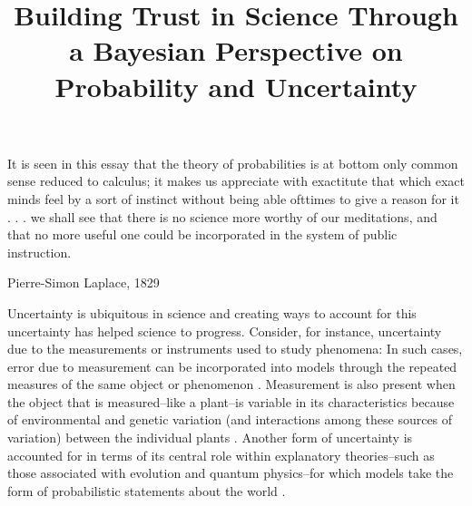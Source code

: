 \documentclass[man]{apa7}
\title{Building Trust in Science Through a Bayesian Perspective on Probability and Uncertainty}
\begin{document}
\maketitle

\setlength{\epigraphwidth}{1.0\textwidth} %
\epigraph{It is seen in this essay that the theory of probabilities is at bottom only common sense reduced to calculus; it makes us appreciate with exactitute that which exact minds feel by a sort of instinct without being able ofttimes to give a reason for it . . . we shall see that there is no science more worthy of our meditations, and that no more useful one could be incorporated in the system of public instruction.}{Pierre-Simon Laplace, 1829}
\setlength{\epigraphwidth}{0.4\textwidth} %

Uncertainty is ubiquitous in science and creating ways to account for this uncertainty has helped science to progress. Consider, for instance, uncertainty due to the measurements or instruments used to study phenomena: In such cases, error due to measurement can be incorporated into models through the repeated measures of the same object or phenomenon \parencite{pls03}. Measurement is also present when the object that is measured--like a plant--is variable in its characteristics because of environmental and genetic variation (and interactions among these sources of variation) between the individual plants \parencite{pls03}. Another form of uncertainty is accounted for in terms of its central role within explanatory theories--such as those associated with evolution and quantum physics--for which models take the form of probabilistic statements about the world \parencite{g00}. 
\end{document}
